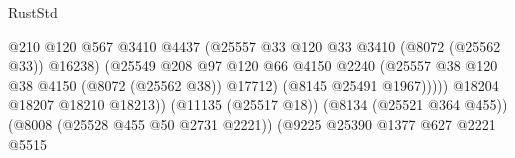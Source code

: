 \begin{lexlean}{RustStd}
\begin{coremodule}
{\begin{coremodule}
{{{{{{{{{{{{{{{{{{{{{{{{{{{{{{{{{{{{{{{{{{{{{{{{{{{{{                                                          @210
                                                          @120
                                                          @567
                                                          @3410
                                                          @4437
                                                          (@25557
                                                            @33
                                                            @120
                                                            @33
                                                            @3410
                                                            (@8072 (@25562 @33))
                                                            @16238)
                                                          (@25549
                                                            @208
                                                            @97
                                                            @120
                                                            @66
                                                            @4150
                                                            @2240
                                                            (@25557
                                                              @38
                                                              @120
                                                              @38
                                                              @4150
                                                              (@8072 (@25562 @38))
                                                              @17712)
                                                            (@8145 @25491 @1967)))))
                                                    @18204
                                                    @18207
                                                    @18210
                                                    @18213))
                                                (@11135 (@25517 @18))
                                                (@8134 (@25521 @364 @455))
                                                (@8008 (@25528 @455 @50 @2731 @2221))
                                                (@9225
                                                  @25390
                                                  @1377
                                                  @627
                                                  @2221
                                                  @5515
}}}}}}}}}}}}}}}}}}}}}}}}}}}}}}}}}}}}}}}}}}}}}}}}}}}}}
\end{coremodule}}
\end{coremodule}
\end{lexlean}
